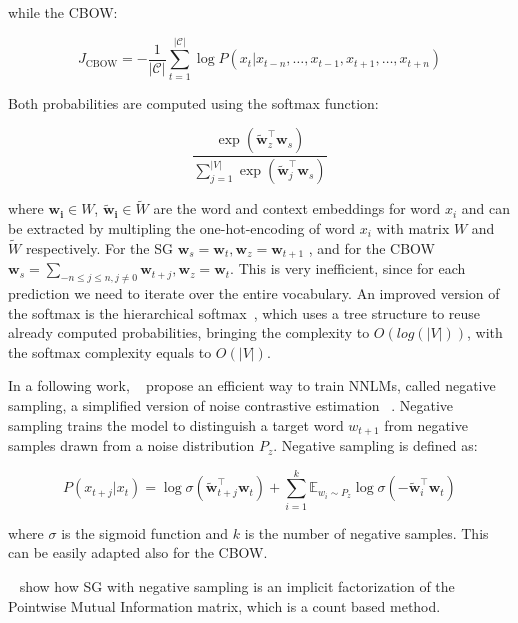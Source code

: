 while the CBOW:

\begin{equation}
J_{\mathrm{CBOW}}=-\frac{1}{|\mathcal{C}|} \sum_{t=1}^{|\mathcal{C}|} \log P\left(x_{t} | x_{t-n}, \dots, x_{t-1}, x_{t+1}, \dots, x_{t+n}\right)
\end{equation}

Both probabilities are computed using the softmax function:

\begin{equation}
\frac{\exp \left(\tilde{\mathbf{w}}_{z}^{\top} \mathbf{w}_{s}\right)}{\sum_{j=1}^{|V|} \exp \left(\tilde{\mathbf{w}}_{j}^{\top} \mathbf{w}_{s}\right)}
\end{equation}

where $\mathbf{w_i} \in W$, $\mathbf{\tilde{w}_i} \in \tilde{W}$ are the word and context embeddings for word $x_i$ and can be extracted by multipling the one-hot-encoding of word $x_i$ with matrix $W$ and $\tilde{W}$ respectively. For the SG $\mathbf{w}_s = \mathbf{w}_t, \mathbf{w}_z = \mathbf{w}_{t+1}$ , and for the CBOW $\mathbf{w}_s = \sum_{-n \leq j \leq n, j \neq 0} \mathbf{w}_{t+j}, \mathbf{w}_z = \mathbf{w}_{t}$.  This is very inefficient, since for each prediction we need to iterate over the entire vocabulary. An improved version of the softmax is the hierarchical softmax~\citep{Morin05hierarchicalprobabilistic}, which uses a tree structure to reuse already computed probabilities, bringing the complexity to $O(log(|V|))$, with the softmax complexity equals to $O(|V|)$.

In a following work, ~\cite{mikolov2013distributed} propose an efficient way to train NNLMs, called negative sampling, a simplified version of noise contrastive estimation ~\citep{gutmann2012contrastive}. Negative sampling trains the model to distinguish
a target word $w_{t+1}$ from negative samples drawn from a noise distribution $P_z$. Negative sampling is defined as:

\begin{equation}
P\left(x_{t+j} | x_{t}\right)=\log \sigma\left(\tilde{\mathbf{w}}_{t+j}^{\top} \mathbf{w}_{t}\right)+\sum_{i=1}^{k} \mathbb{E}_{w_{i} \sim P_{z}} \log \sigma\left(-\tilde{\mathbf{w}}_{i}^{\top} \mathbf{w}_{t}\right)
\label{eq:neg_samp}
\end{equation}

where $\sigma$ is the sigmoid function and $k$ is the number of negative samples. This can be easily adapted also for the CBOW.

~\cite{levy2014embedding_pmi} show how SG with negative sampling is an implicit factorization of the Pointwise Mutual Information matrix, which is a count based        method.


